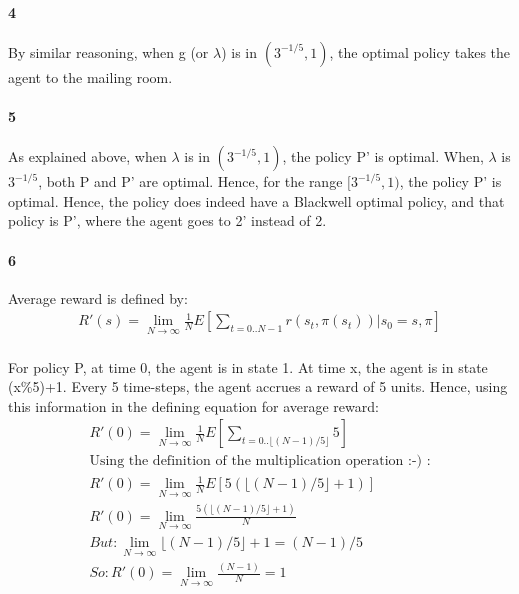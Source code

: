 \documentclass[10pt]{article}
\begin{document}
\paragraph{4} 
By similar reasoning, when g (or $\lambda$) is in $(3^{-1/5},1)$, the optimal policy takes the agent to the mailing room.

\paragraph{5} As explained above, when $\lambda$ is in $(3^{-1/5},1)$, the policy P' is optimal. When, $\lambda$ is $3^{-1/5}$, both P and P' are optimal. Hence, for the range $[3^{-1/5},1)$, the policy P' is optimal. Hence, the policy does indeed have a Blackwell optimal policy, and that policy is P', where the agent goes to 2' instead of 2.

\paragraph{6} 
Average reward is defined by:
\begin{eqnarray}
R'(s)=\lim_{N\rightarrow \infty}\frac{1}{N}E[\sum_{t=0..N-1}r(s_{t},\pi(s_{t}))|s_{0}=s,\pi]\\
\end{eqnarray}

For policy P, at time 0, the agent is in state 1. At time x, the agent is in state (x\%5)+1. Every 5 time-steps, the agent accrues a reward of 5 units. Hence, using this information in the defining equation for average reward:
\begin{eqnarray}
R'(0)=\lim_{N\rightarrow \infty}\frac{1}{N}E[\sum_{t=0..\lfloor(N-1)/5\rfloor}5]\\
\text{Using the definition of the multiplication operation :-) :} \\
R'(0)=\lim_{N\rightarrow \infty}\frac{1}{N}E[5(\lfloor(N-1)/5\rfloor+1)]\\
R'(0)=\lim_{N\rightarrow \infty}\frac{5(\lfloor(N-1)/5\rfloor+1)}{N}\\
But: \lim_{N\rightarrow \infty}\lfloor(N-1)/5\rfloor+1=(N-1)/5\\
So: R'(0)=\lim_{N\rightarrow \infty}\frac{(N-1)}{N}=1\\
\end{eqnarray}
\end{document}
